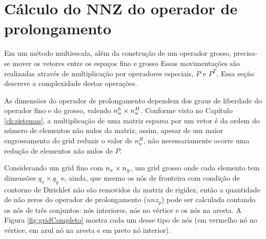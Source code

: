 \section{Cálculo do NNZ do operador de prolongamento}\label{sec:complexProlong}

Em um método multiescala, além da construção de um operador grosso,  precisa-se mover os vetores entre os espaços fino e grosso  Essas movimentações são realizadas através de multiplicação por operadores especiais, $P$ e $P^T$. Essa seção descreve a complexidade destas operações.

As dimensões do operador de prolongamento dependem dos graus de liberdade do operador fino e do  grosso, valendo $n_u^h \times n_u^H$. Conforme visto no Capítulo \ref{ch:sistemas}, a multiplicação de uma matriz esparsa por um vetor é da ordem do número de elementos  não nulos da matriz, assim, apesar de um maior engrossamento do grid reduzir o valor de $n_u^H$,  não necessariamente ocorre  uma redução de elementos não nulos de $P$. 

Considerando um grid fino com $n_x \times n_y$, um grid grosso onde cada elemento tem dimensões $q_x \times q_y$  e, ainda, que mesmo os nós de fronteira com condição de contorno de Dirichlet não são removidos da matriz de rigidez, então a quantidade de não zeros do operador de prolongamento ($nnz_p$) pode ser calculada contando os nós de três conjuntos:  nós interiores, nós no vértice e os nós na aresta.  A Figura \ref{fig:gridCompleto} mostra cada um desse tipo de nós (em vermelho nó no vértice, em azul nó na aresta e em preto nó interior).


